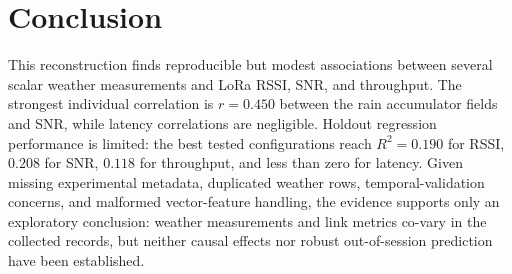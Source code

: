 \section{Conclusion}
This reconstruction finds reproducible but modest associations between several scalar weather measurements and LoRa RSSI, SNR, and throughput. The strongest individual correlation is $r=0.450$ between the rain accumulator fields and SNR, while latency correlations are negligible. Holdout regression performance is limited: the best tested configurations reach $R^2=0.190$ for RSSI, $0.208$ for SNR, $0.118$ for throughput, and less than zero for latency. Given missing experimental metadata, duplicated weather rows, temporal-validation concerns, and malformed vector-feature handling, the evidence supports only an exploratory conclusion: weather measurements and link metrics co-vary in the collected records, but neither causal effects nor robust out-of-session prediction have been established.

